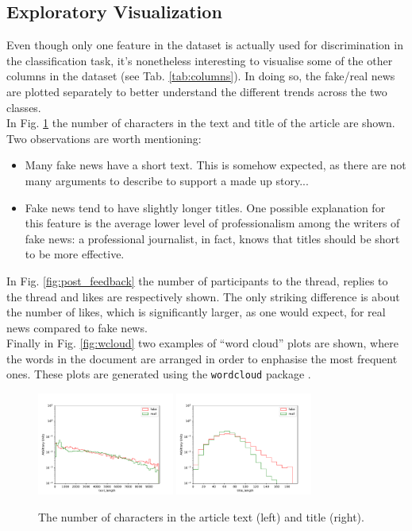\documentclass[a4paper,12pt]{article} %
\begin{document}
\subsection{Exploratory Visualization}
\label{sec:visuals}
Even though only one feature in the dataset is actually used for discrimination
in the classification task, it's nonetheless interesting to visualise
some of the other columns in the dataset (see Tab. \ref{tab:columns}).
In doing so, the fake/real news are plotted separately to better understand
the different trends across the two classes. \\
In Fig. \ref{fig:text_title_length} the number of characters in
the text and title of the article are shown.
Two observations are worth mentioning:
\begin{itemize}
\item Many fake news have a short text. This is somehow expected,
as there are not many arguments to describe to support a made up story...
\item Fake news tend to have slightly longer titles.
One possible explanation for this feature is the average lower level
of professionalism among the writers of fake news: a professional
journalist, in fact, knows that titles should be short to be more effective.
\end{itemize}
In Fig. \ref{fig:post_feedback} the
number of participants to the thread, replies to the thread and likes are respectively shown.
The only striking difference is about the number of likes, which is
significantly larger, as one would expect, for real news compared to fake news. \\
Finally in Fig. \ref{fig:wcloud} two examples of ``word cloud'' plots are shown,
where the words in the document are arranged in order to enphasise
the most frequent ones. These plots are generated using the \texttt{wordcloud} package \cite{wordcloud}.

\begin{figure}[h!]
\caption{The number of characters in the article text (left) and title (right). \label{fig:text_title_length}}
\begin{center}
\includegraphics[width=0.4\textwidth]{plots/text_length} \hspace{0.2cm}
\includegraphics[width=0.4\textwidth]{plots/title_length}
\end{center}
\end{figure}
\end{document}
